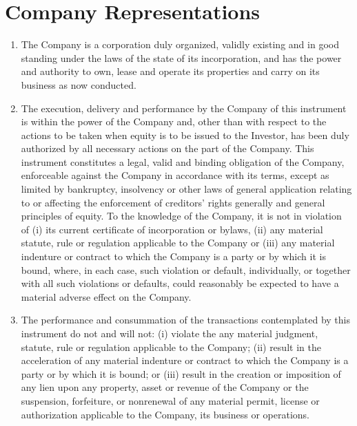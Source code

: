 \section{Company Representations}
\label{sec:companyrepresentations}

\begin{enumerate}[label=(\alph*)]

\item {The Company is a corporation duly organized, validly existing
  and in good standing under the laws of the state of its
  incorporation, and has the power and authority to own, lease and
  operate its properties and carry on its business as now conducted.}

\item {\begin{sloppypar}
  The execution, delivery and performance by the Company of this
  instrument is within the power of the Company and, other than with
  respect to the actions to be taken when equity is to be issued to
  the Investor, has been duly authorized by all necessary actions on
  the part of the Company. This instrument constitutes a legal, valid
  and binding obligation of the Company, enforceable against the
  Company in accordance with its terms, except as limited by
  bankruptcy, insolvency or other laws of general application relating
  to or affecting the enforcement of creditors’ rights generally and
  general principles of equity.  To the knowledge of the Company, it
  is not in violation of (i) its current certificate of incorporation
  or bylaws, (ii) any material statute, rule or regulation applicable
  to the Company or (iii) any material indenture or contract to which
  the Company is a party or by which it is bound, where, in each case,
  such violation or default, individually, or together with all such
  violations or defaults, could reasonably be expected to have a
  material adverse effect on the Company.\end{sloppypar}}

\item {\begin{sloppypar}The performance and consummation of the transactions
  contemplated by this instrument do not and will not: (i) violate the
  any material judgment, statute, rule or regulation applicable to the
  Company; (ii) result in the acceleration of any material indenture
  or contract to which the Company is a party or by which it is bound;
  or (iii) result in the creation or imposition of any lien upon any
  property, asset or revenue of the Company or the suspension,
  forfeiture, or nonrenewal of any material permit, license or
  authorization applicable to the Company, its business or
  operations.\end{sloppypar}}


\end{enumerate}
